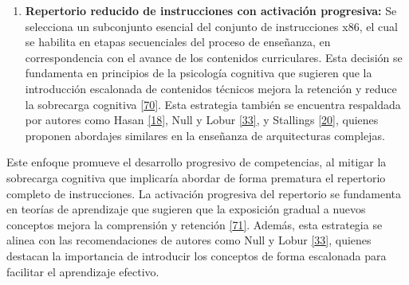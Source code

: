 \documentclass[12pt,oneside]{templates/unerthesis}
\providecommand{\tightlist}{%
  \setlength{\itemsep}{0pt}\setlength{\parskip}{0pt}}
\begin{document}
\begin{enumerate}
\def\labelenumi{\arabic{enumi}.}
\setcounter{enumi}{2}
\tightlist
\item
  \textbf{Repertorio reducido de instrucciones con activación progresiva:}
  Se selecciona un subconjunto esencial del conjunto de instrucciones x86, el cual se habilita en etapas secuenciales del proceso de enseñanza, en correspondencia con el avance de los contenidos curriculares. Esta decisión se fundamenta en principios de la psicología cognitiva que sugieren que la introducción escalonada de contenidos técnicos mejora la retención y reduce la sobrecarga cognitiva \protect\hyperlink{ref-nationalacademies2018how}{{[}70{]}}. Esta estrategia también se encuentra respaldada por autores como Hasan \protect\hyperlink{ref-hasan_survey_2012}{{[}18{]}}, Null y Lobur \protect\hyperlink{ref-null_essentials_2023}{{[}33{]}}, y Stallings \protect\hyperlink{ref-stallings_computer_2021}{{[}20{]}}, quienes proponen abordajes similares en la enseñanza de arquitecturas complejas.
\end{enumerate}

\begin{table}[!h]
\centering
\caption{\label{tab:activacionprogresiva}Activación progresiva del repertorio de instrucciones}
\centering
{}
\end{table}

Este enfoque promueve el desarrollo progresivo de competencias, al mitigar la sobrecarga cognitiva que implicaría abordar de forma prematura el repertorio completo de instrucciones. La activación progresiva del repertorio se fundamenta en teorías de aprendizaje que sugieren que la exposición gradual a nuevos conceptos mejora la comprensión y retención \protect\hyperlink{ref-sweller2010cognitive}{{[}71{]}}. Además, esta estrategia se alinea con las recomendaciones de autores como Null y Lobur \protect\hyperlink{ref-null_essentials_2023}{{[}33{]}}, quienes destacan la importancia de introducir los conceptos de forma escalonada para facilitar el aprendizaje efectivo.
\end{document}

